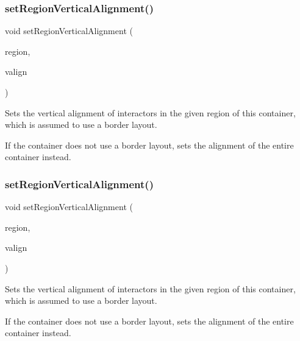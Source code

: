 \subsubsection{\texorpdfstring{set\+Region\+Vertical\+Alignment()}{setRegionVerticalAlignment()}\hspace{0.1cm}{\footnotesize\ttfamily [1/2]}}
{\footnotesize\ttfamily void set\+Region\+Vertical\+Alignment (\begin{DoxyParamCaption}\item[{const std\+::string \&}]{region,  }\item[{const std\+::string \&}]{valign }\end{DoxyParamCaption})\hspace{0.3cm}{\ttfamily [virtual]}}



Sets the vertical alignment of interactors in the given region of this container, which is assumed to use a border layout. 

If the container does not use a border layout, sets the alignment of the entire container instead. \mbox{\label{classGContainer_a1efb2d3b67fb479aad27a6c0032ee70e}} 
\subsubsection{\texorpdfstring{set\+Region\+Vertical\+Alignment()}{setRegionVerticalAlignment()}\hspace{0.1cm}{\footnotesize\ttfamily [2/2]}}
{\footnotesize\ttfamily void set\+Region\+Vertical\+Alignment (\begin{DoxyParamCaption}\item[{\mbox{\hyperlink{classGContainer_a81a01a86de31071a92e6cce0bab9bc4b}{Region}}}]{region,  }\item[{Vertical\+Alignment}]{valign }\end{DoxyParamCaption})\hspace{0.3cm}{\ttfamily [virtual]}}



Sets the vertical alignment of interactors in the given region of this container, which is assumed to use a border layout. 

If the container does not use a border layout, sets the alignment of the entire container instead. \mbox{\label{classGInteractor_aca25d49481f9bf5fc8f7df4c086c4ce7}} 
